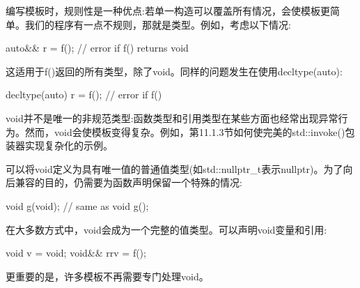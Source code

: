 编写模板时，规则性是一种优点:若单一构造可以覆盖所有情况，会使模板更简单。我们的程序有一点不规则，那就是类型。例如，考虑以下情况:

\begin{cpp}
auto&& r = f(); // error if f() returns void
\end{cpp}

这适用于f()返回的所有类型，除了void。同样的问题发生在使用decltype(auto):

\begin{cpp}
decltype(auto) r = f(); // error if f()
\end{cpp}

void并不是唯一的非规范类型:函数类型和引用类型在某些方面也经常出现异常行为。然而，void会使模板变得复杂。例如，第11.1.3节如何使完美的std::invoke()包装器实现复杂化的示例。

可以将void定义为具有唯一值的普通值类型(如std::nullptr\_t表示nullptr)。为了向后兼容的目的，仍需要为函数声明保留一个特殊的情况:

\begin{cpp}
void g(void); // same as void g();
\end{cpp}

在大多数方式中，void会成为一个完整的值类型。可以声明void变量和引用:

\begin{cpp}
void v = void{};
void&& rrv = f();
\end{cpp}

更重要的是，许多模板不再需要专门处理void。













































